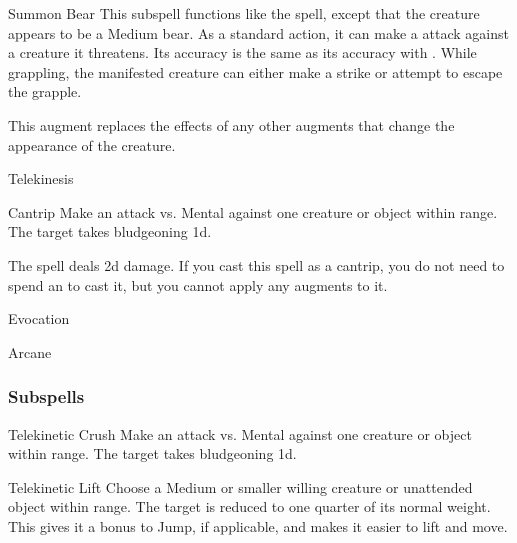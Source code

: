 \begin{ability}[\nth{2}]{Summon Bear}
This subspell functions like the  spell, except that the creature appears to be a Medium bear.
As a standard action, it can make a  attack against a creature it threatens.
Its accuracy is the same as its accuracy with .
While grappling, the manifested creature can either make a strike or attempt to escape the grapple.

This augment replaces the effects of any other augments that change the appearance of the creature.
\end{ability}
\vspace{0.25em}

\newpage
\begin{spellsection}{Telekinesis}

\begin{spellheader}
\end{spellheader}


\begin{ability}{Cantrip}
Make an attack vs. Mental against one creature or object within \rngmed range.
\hit The target takes bludgeoning  \minus1d.
\end{ability}



 The spell deals \minus2d damage. If you cast this spell as a cantrip,
you do not need to spend an  to cast it,
but you cannot apply any augments to it.


 Evocation

 Arcane
\end{spellsection}


\subsubsection{Subspells}


\begin{ability}[\nth{1}]{Telekinetic Crush}
Make an attack vs. Mental against one creature or object within \rngmed range.
\hit The target takes bludgeoning  \plus1d.
\end{ability}
\vspace{0.25em}


\begin{ability}[\nth{1}]{Telekinetic Lift}
Choose a Medium or smaller willing creature or unattended object within \rngclose range.
The target is reduced to one quarter of its normal weight.
This gives it a  bonus to Jump, if applicable, and makes it easier to lift and move.
\end{ability}
\vspace{0.25em}


